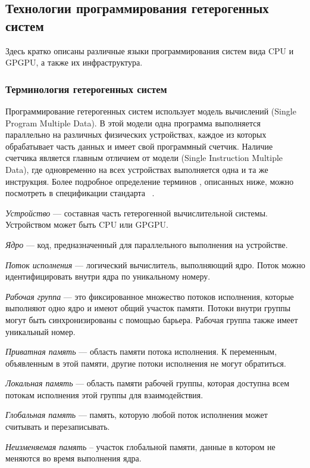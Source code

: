 \subsection[Технологии программирования гетерогенных систем] {Технологии
программирования гетерогенных\\ систем}
Здесь кратко описаны различные языки программирования систем вида 
CPU и GPGPU, а также их инфраструктура.

\subsubsection{Терминология гетерогенных систем}
Программирование гетерогенных систем использует модель вычислений  
(Single Program Multiple Data).
В этой модели одна программа выполняется параллельно на
различных физических устройствах, каждое из которых обрабатывает часть данных и
имеет свой программный счетчик.
Наличие счетчика является главным отличием от модели  (Single
Instruction Multiple Data), где одновременно на всех устройствах выполняется
одна и та же инструкция.
Более подробное определение терминов , описанных ниже, можно 
посмотреть в спецификации стандарта ~\cite{OpenCL_spec}.

\emph{Устройство} --- составная часть гетерогенной вычислительной системы.
Устройством может быть CPU или GPGPU.

\emph{Ядро} --- код, предназначенный для параллельного выполнения на
устройстве.
	
\emph{Поток исполнения} --- логический вычислитель, выполняющий ядро.
Поток можно идентифицировать внутри ядра по уникальному номеру.

\emph{Рабочая группа} --- это фиксированное множество потоков исполнения,
которые выполняют одно ядро и имеют общий участок памяти.
Потоки внутри группы могут быть синхронизированы с помощью барьера.
Рабочая группа также имеет уникальный номер.

\emph{Приватная память} --- область памяти потока исполнения. 
К переменным, объявленным в этой памяти, другие потоки исполнения не могут 
обратиться.

\emph{Локальная память} --- область памяти рабочей группы, которая доступна
всем потокам исполнения этой группы для взаимодействия.

\emph{Глобальная память} --- память, которую любой поток исполнения может считывать и перезаписывать.

\emph{Неизменяемая память} -- участок глобальной памяти, данные в котором не меняются во время выполнения ядра.

